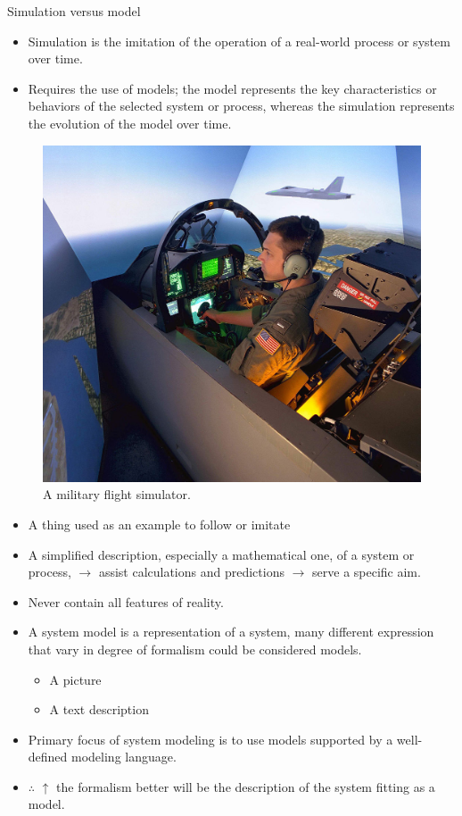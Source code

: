 \documentclass[11pt,dvipsnames,ignorenonframetext,aspectratio=169]{beamer}
\providecommand{\tightlist}{%
  \setlength{\itemsep}{0pt}\setlength{\parskip}{0pt}}
\begin{document}
\begin{frame}{Simulation versus model}
\protect\hypertarget{simulation-versus-model}{}
\small

\begin{itemize}
\tightlist
\item
  Simulation is the imitation of the operation of a real-world process
  or system over time.
\item
  Requires the use of models; the model represents the key
  characteristics or behaviors of the selected system or process,
  whereas the simulation represents the evolution of the model over
  time.
\end{itemize}

\begin{figure}
\includegraphics[width=0.55\linewidth]{../images/military_flight_simulator} \caption{A military flight simulator.}\label{fig:flight-simulation}
\end{figure}
\end{frame}

\begin{frame}{}
\protect\hypertarget{section-1}{}
\begin{itemize}
\tightlist
\item
  A thing used as an example to follow or imitate
\item
  A simplified description, especially a mathematical one, of a system
  or process, \(\longrightarrow\) assist calculations and predictions
  \(\longrightarrow\) serve a specific aim.
\item
  \alert{Never} contain all features of reality.
\item
  A system model is a representation of a system, many different
  expression that vary in degree of formalism could be considered
  models.

  \begin{itemize}
  \tightlist
  \item
    A picture
  \item
    A text description
  \end{itemize}
\item
  Primary focus of system modeling is to use models supported by a
  \alert{well-defined} modeling \alert{language}.
\item
  \(\therefore\) \(\uparrow\) the formalism better will be the
  description of the system fitting as a model.
\end{itemize}
\end{frame}
\end{document}
